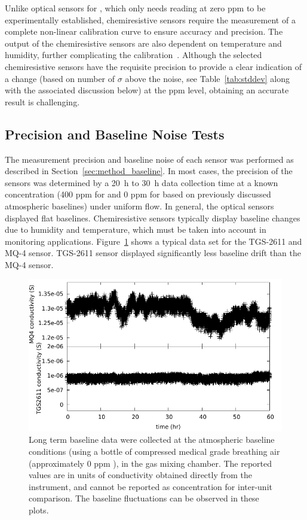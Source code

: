 \documentclass[sensors,article,submit,moreauthors,pdftex]{Definitions/mdpi}
\begin{document}
			Unlike optical sensors for , which only needs reading at zero ppm to be experimentally established, chemiresistive sensors require the measurement of a complete non-linear calibration curve to ensure accuracy and precision.
			The output of the chemiresistive sensors are also dependent on temperature and humidity, further complicating the calibration~\cite{benkstein_analytical_2014}.
			Although the selected chemiresistive sensors have the requisite precision to provide a clear indication of a change (based on number of $\sigma$ above the noise, see Table~\ref{tab:stddev} along with the associated discussion below) at the ppm level, obtaining an accurate result is challenging.
			

		\subsection{Precision and Baseline Noise Tests}
			\label{sec:main_baseline}
			
			The measurement precision and baseline noise of each sensor was performed as described in Section~\ref{sec:method_baseline}.
			In most cases, the precision of the sensors was determined by a \SI{20}{\hour} to \SI{30}{\hour} data collection time at a known concentration (400 ppm for  and 0 ppm for  based on previously discussed atmospheric baselines) under uniform flow.
			In general, the optical sensors displayed flat baselines.
			Chemiresistive sensors typically display baseline changes due to humidity and temperature, which must be taken into account in monitoring applications.
			Figure~\ref{fig:MQ4TGSbaseline} shows a typical data set for the TGS-2611 and MQ-4 sensor.
			TGS-2611 sensor displayed significantly less baseline drift than the MQ-4 sensor.
			
			
			\begin{figure}[!t]
				\centering
				\includegraphics[width=\columnwidth]{honey5.pdf}
				\caption{%
					Long term baseline data were collected at the atmospheric baseline conditions (using a bottle of compressed medical grade breathing air (approximately 0 ppm ), in the gas mixing chamber.
					The reported values are in units of conductivity obtained directly from the instrument, and cannot be reported as concentration for inter-unit comparison.
					The baseline fluctuations can be observed in these plots.
				}
				\label{fig:MQ4TGSbaseline}
			\end{figure}
			
\end{document}
